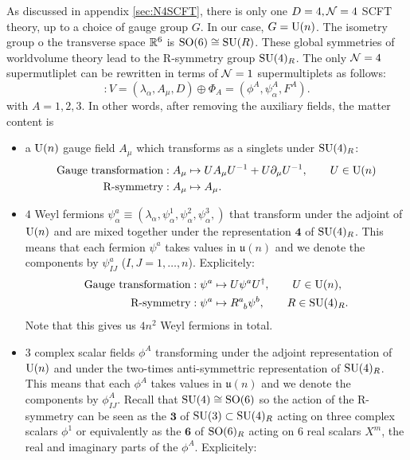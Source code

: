 \documentclass[a4paper,11pt]{article}
\begin{document}
        As discussed in appendix \ref{sec:N4SCFT}, there is only one $D=4,\mathcal{N}=4$ SCFT theory, up to a choice of gauge group $G$. In our case, $G=\text{U}(n)$. The isometry group o the transverse space $\mathbb{R}^6$ is $\text{SO}(6)\cong\text{SU}(R)$. These global symmetries \marker of worldvolume theory lead to the R-symmetry group $\text{SU}(4)_R$. The only $\mathcal{N}=4$ supermutliplet can be rewritten in terms of $\mathcal{N}=1$ supermultiplets as follows:
        \begin{equation}
            [\mN = 4 \text{ vector multiplet}] : V = (\lambda_\alpha, A_\mu, D) \oplus \Phi_A = (\phi^A,\psi^A_\alpha,F^A).
        \end{equation}
        with $A=1,2,3$. In other words, after removing the auxiliary fields, the matter content is
        \begin{itemize}
            \item a $\text{U}(n)$ gauge field $A_\mu$ which transforms as a singlets under $\text{SU}(4)_R$:
            \begin{align}
                \text{Gauge transformation} &: A_\mu\mapsto UA_\mu U^{-1}+U\partial_\mu U^{-1},\qquad U\in\text{U}(n)\label{eq:transfA1}\\
                \text{R-symmetry} &: A_\mu\mapsto A_\mu.\label{eq:transfA2}
            \end{align}
            \item $4$ Weyl fermions $\psi^{a}_\alpha\equiv(\lambda_\alpha,\psi^1_\alpha,\psi^2_\alpha,\psi^3_\alpha,)$ that transform under the adjoint of $\text{U}(n)$ and are mixed together under the representation $\boldsymbol{4}$ of $\text{SU}(4)_R$. This means that each fermion $\psi^a$ takes values in $\mathfrak{u}(n)$ and we denote the components by $\psi^a_{IJ}$ ($I,J=1,\dots,n$). Explicitely:
            \begin{align}
                \text{Gauge transformation} &: \psi^a \mapsto U \psi^a U^\dagger ,\qquad U\in\U(n),\label{eq:transfpsi1}\\
                \text{R-symmetry} &: \psi^a\mapsto R\indices{^a_b}\psi^b,\qquad R\in\SU(4)_R.\label{eq:transfpsi2}
            \end{align}
            Note that this gives us $4n^2$ Weyl fermions in total.
            \item $3$ complex scalar fields $\phi^A$ transforming under the adjoint representation of $\text{U}(n)$ and under the two-times anti-symmettric representation of $\text{SU}(4)_R$. This means that each $\phi^A$ takes values in $\mathfrak{u}(n)$ and we denote the components by $\phi^A_{IJ}$. Recall that $\text{SU}(4)\cong\text{SO}(6)$ so the action of the R-symmetry can be seen as the $\boldsymbol{3}$ of $\text{SU}(3)\subset\text{SU}(4)_R$ acting on three complex scalars $\phi^1$ or equivalently as the $\boldsymbol{6}$ of $\text{SO}(6)_R$ acting on $6$ real scalars $X^m$, the real and imaginary parts of the $\phi^A$. Explicitely:

\end{itemize}
\end{document}

